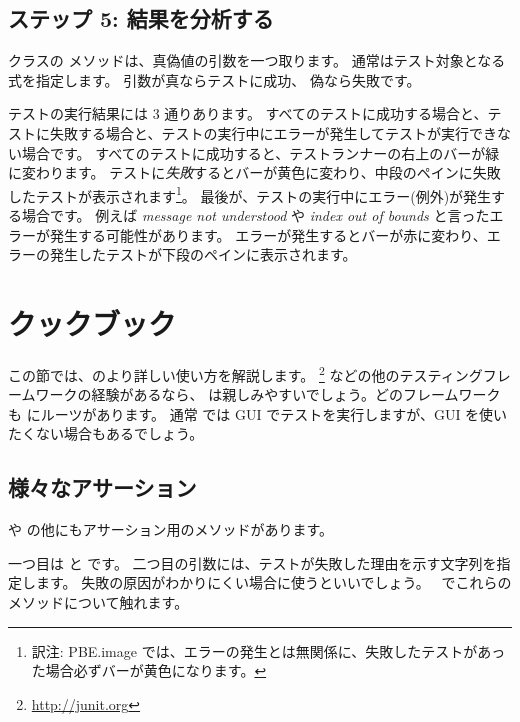 \documentclass[a4paper,10pt,twoside]{book}
\begin{document}
\subsection{ステップ 5: 結果を分析する}

 クラスの  メソッドは、真偽値の引数を一つ取ります。
通常はテスト対象となる式を指定します。
引数が真ならテストに成功、
偽なら失敗です。


テストの実行結果には 3 通りあります。
すべてのテストに成功する場合と、テストに失敗する場合と、テストの実行中にエラーが発生してテストが実行できない場合です。
すべてのテストに成功すると、テストランナーの右上のバーが緑に変わります。
テストに\emph{失敗}するとバーが黄色に変わり、中段のペインに失敗したテストが表示されます\footnote{訳注: PBE.image では、エラーの発生とは無関係に、失敗したテストがあった場合必ずバーが黄色になります。}。
最後が、テストの実行中にエラー(例外)が発生する場合です。
例えば \emph{message not understood} や \emph{index out of bounds} と言ったエラーが発生する可能性があります。
エラーが発生するとバーが赤に変わり、エラーの発生したテストが下段のペインに表示されます。


\section{\SUnit クックブック}
この節では、\SUnit のより詳しい使い方を解説します。
\JUnit\footnote{\url{http://junit.org}} などの他のテスティングフレームワークの経験があるなら、
\SUnit は親しみやすいでしょう。どのフレームワークも \SUnit にルーツがあります。
通常 \SUnit では GUI でテストを実行しますが、GUI を使いたくない場合もあるでしょう。
\subsection{様々なアサーション}
 や  の他にもアサーション用のメソッドがあります。

一つ目は  と  です。
二つ目の引数には、テストが失敗した理由を示す文字列を指定します。
失敗の原因がわかりにくい場合に使うといいでしょう。
~でこれらのメソッドについて触れます。
\end{document}

